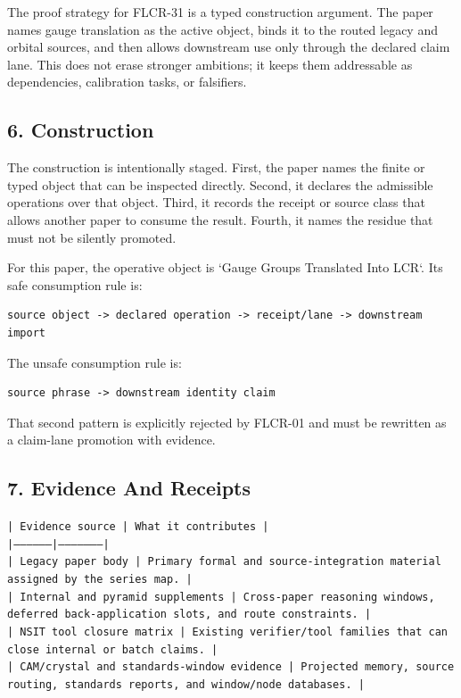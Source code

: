 \documentclass[11pt]{article}
\begin{document}
The proof strategy for FLCR-31 is a typed construction argument. The paper names gauge translation as the active object, binds it to the routed legacy and orbital sources, and then allows downstream use only through the declared claim lane. This does not erase stronger ambitions; it keeps them addressable as dependencies, calibration tasks, or falsifiers.

\subsection*{6. Construction}

The construction is intentionally staged. First, the paper names the finite or
typed object that can be inspected directly. Second, it declares the admissible
operations over that object. Third, it records the receipt or source class that
allows another paper to consume the result. Fourth, it names the residue that
must not be silently promoted.

For this paper, the operative object is `Gauge Groups Translated Into LCR`. Its safe consumption
rule is:

\begin{verbatim}
source object -> declared operation -> receipt/lane -> downstream import
\end{verbatim}

The unsafe consumption rule is:

\begin{verbatim}
source phrase -> downstream identity claim
\end{verbatim}

That second pattern is explicitly rejected by FLCR-01 and must be rewritten as
a claim-lane promotion with evidence.

\subsection*{7. Evidence And Receipts}

\noindent\texttt{| Evidence source | What it contributes |}\\
\noindent\texttt{|-----------------|---------------------|}\\
\noindent\texttt{| Legacy paper body | Primary formal and source-integration material assigned by the series map. |}\\
\noindent\texttt{| Internal and pyramid supplements | Cross-paper reasoning windows, deferred back-application slots, and route constraints. |}\\
\noindent\texttt{| NSIT tool closure matrix | Existing verifier/tool families that can close internal or batch claims. |}\\
\noindent\texttt{| CAM/crystal and standards-window evidence | Projected memory, source routing, standards reports, and window/node databases. |}\\
\end{document}
